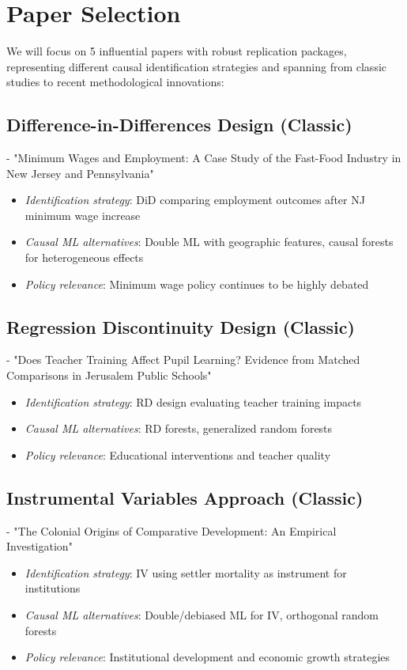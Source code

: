 \documentclass[12pt,a4paper]{article}
\begin{document}
\section{Paper Selection}

We will focus on 5 influential papers with robust replication packages, representing different causal identification strategies and spanning from classic studies to recent methodological innovations:

\subsection{Difference-in-Differences Design (Classic)}
\textbf{\citet{card1994minimum}} - "Minimum Wages and Employment: A Case Study of the Fast-Food Industry in New Jersey and Pennsylvania"
\begin{itemize}
    \item \textit{Identification strategy}: DiD comparing employment outcomes after NJ minimum wage increase
    \item \textit{Causal ML alternatives}: Double ML with geographic features, causal forests for heterogeneous effects
    \item \textit{Policy relevance}: Minimum wage policy continues to be highly debated
\end{itemize}

\subsection{Regression Discontinuity Design (Classic)}
\textbf{\citet{angrist2001does}} - "Does Teacher Training Affect Pupil Learning? Evidence from Matched Comparisons in Jerusalem Public Schools"
\begin{itemize}
    \item \textit{Identification strategy}: RD design evaluating teacher training impacts
    \item \textit{Causal ML alternatives}: RD forests, generalized random forests
    \item \textit{Policy relevance}: Educational interventions and teacher quality
\end{itemize}

\subsection{Instrumental Variables Approach (Classic)}
\textbf{\citet{acemoglu2001colonial}} - "The Colonial Origins of Comparative Development: An Empirical Investigation"
\begin{itemize}
    \item \textit{Identification strategy}: IV using settler mortality as instrument for institutions
    \item \textit{Causal ML alternatives}: Double/debiased ML for IV, orthogonal random forests
    \item \textit{Policy relevance}: Institutional development and economic growth strategies
\end{itemize}
\end{document}
